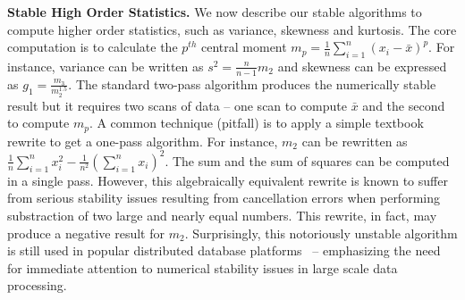 \textbf{Stable High Order Statistics.}
We now describe our stable algorithms to compute higher order statistics, such as variance, skewness and kurtosis. The core computation is to calculate the $p^{th}$ central moment $m_p=\frac{1}{n}\sum\limits_{i=1}^{n}(x_i-\bar{x})^p$. For instance, variance can be written as $s^2=\frac{n}{n-1}m_2$ and skewness can be expressed as $g_1=\frac{m_3}{m_2^{1.5}}$. The standard two-pass algorithm produces the numerically stable result but it requires two scans of data -- one scan to compute $\bar{x}$ and the second to compute $m_p$. A common technique (pitfall) is to apply a simple textbook rewrite to get a one-pass algorithm. For instance, $m_2$ can be rewritten as $\frac{1}{n}\sum\limits_{i=1}^{n}x_i^2-\frac{1}{n^2}(\sum\limits_{i=1}^{n}x_i)^2$. The sum and the sum of squares can be computed in a single pass. However, this algebraically equivalent rewrite is known to suffer from serious stability issues resulting from cancellation errors when performing substraction of two large and nearly equal numbers. This rewrite, in fact, may produce a negative result for $m_2$. Surprisingly, this notoriously unstable algorithm is still used in popular distributed database platforms~\cite{teradata} -- emphasizing the need for immediate attention to numerical stability issues in large scale data processing.





